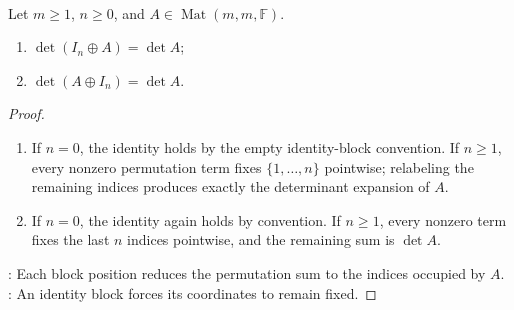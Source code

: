 \begin{lemma} \label{lem:determinant-identity-direct-sum} \\
Let $m\geq1$, $n\geq0$, and $A\in\operatorname{Mat}(m,m,\mathbb{F})$.
\begin{enumerate}[label=(\roman*)]
\setlength{\itemsep}{0pt}
\item $\det(I_n\oplus A)=\det A$;
\item $\det(A\oplus I_n)=\det A$.
\end{enumerate}
\begin{proof}
\begin{enumerate}[label=(\roman*)]
\setlength{\itemsep}{0pt}
\item If $n=0$, the identity holds by the empty identity-block convention. If $n\geq1$, every nonzero permutation term fixes $\{1,\ldots,n\}$ pointwise; relabeling the remaining indices produces exactly the determinant expansion of $A$.
\item If $n=0$, the identity again holds by convention. If $n\geq1$, every nonzero term fixes the last $n$ indices pointwise, and the remaining sum is $\det A$.
\end{enumerate}
: Each block position reduces the permutation sum to the indices occupied by $A$.\\
: An identity block forces its coordinates to remain fixed.
\end{proof}
\end{lemma}

